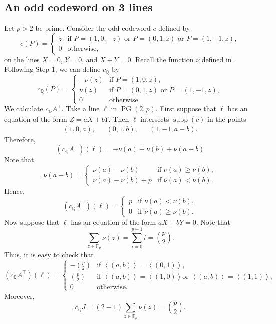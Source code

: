 \documentclass[12pt, a4paper]{article}
\theoremstyle{definition}
\newcommand{\FF}{\mathbb F}
\newcommand{\QQ}{\mathbb Q}
\newcommand{\vspan}[1]{\left \langle #1 \right \rangle}
\DeclareMathOperator{\supp}{supp}
\DeclareMathOperator{\PG}{PG}
\newcommand{\pg}{\PG}
\begin{document}
\subsection{An odd codeword on 3 lines}

 Let $p > 2$ be prime.
 Consider the odd codeword $c$ defined by
 \[
 c(P) = \begin{cases}
  z & \text{if } P =(1,0,-z) \text{ or } P = (0,1,z) \text{ or } P=(1,-1,z), \\
  0 & \text{otherwise,}
 \end{cases}
\]
on the lines $X=0$, $Y=0$, and $X+Y=0$.
Recall the function $\nu$ defined in .
Following Step 1, we can define $c_\QQ$ by
\[
 c_\QQ(P) = \begin{cases}
  - \nu(z) & \text{if } P = (1,0,z), \\
  \nu(z) & \text{if } P = (0,1,z) \text{ or } P = (1,-1,z), \\
  0 & \text{otherwise}.
 \end{cases}
\]
We calculate $c_\QQ A^\top$.
Take a line $\ell$ in $\pg(2,p)$.
First suppose that $\ell$ has an equation of the form $Z = aX + bY$.
Then $\ell$ intersects $\supp(c)$ in the points
\begin{align*}
 (1,0,a), && (0,1,b), && (1,-1,a-b).
\end{align*}
Therefore,
\[
 (c_\QQ A^\top)(\ell) = -\nu(a) + \nu(b) + \nu(a-b)
\]
Note that
\[
 \nu(a-b) = \begin{cases}
  \nu(a) - \nu(b) & \text{if } \nu(a) \geq \nu(b), \\
  \nu(a) - \nu(b) + p & \text{if } \nu(a) < \nu(b).
 \end{cases}
\]
Hence,
\[
 (c_\QQ A^\top)(\ell) = \begin{cases}
  p & \text{if } \nu(a) < \nu(b), \\
  0 & \text{if } \nu(a) \geq \nu(b).
 \end{cases}
\]
Now suppose that $\ell$ has an equation of the form $aX + bY = 0$.
Note that
\[
 \sum_{z \in \FF_p} \nu(z) = \sum_{i=0}^{p-1} i = \binom p 2.
\]
Thus, it is easy to check that
\[
 (c_\QQ A^\top)(\ell) = \begin{cases}
  - \binom p2 & \text{if } \vspan{(a,b)} = \vspan{(0,1)}, \\
  \binom p2 & \text{if } \vspan{(a,b)} = \vspan{(1,0)} \text{or } \vspan{(a,b)} = \vspan{(1,1)}, \\
  0 & \text{otherwise.}
 \end{cases}
\]
Moreover,
\[
 c_\QQ J = (2 - 1) \sum_{z \in \FF_p} \nu(z) = \binom p 2.
\]
\end{document}
